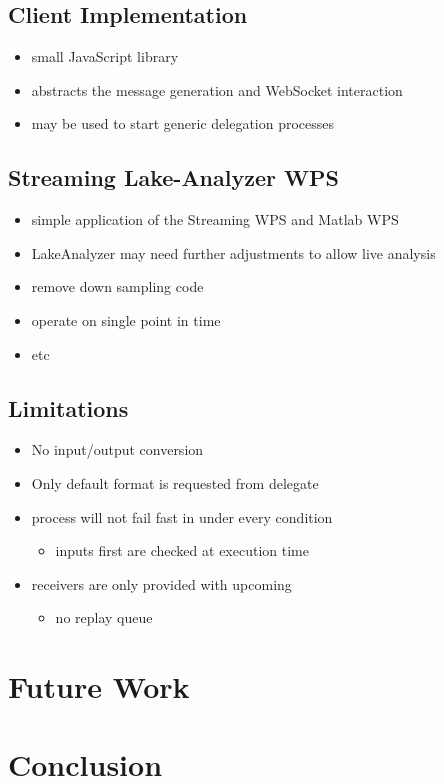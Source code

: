	\subsection{Client Implementation}
	\begin{itemize}
		\item small JavaScript library
		\item abstracts the message generation and WebSocket interaction
		\item may be used to start generic delegation processes
	\end{itemize}
	\subsection{Streaming Lake-Analyzer WPS}
	\begin{itemize}
		\item simple application of the Streaming WPS and Matlab WPS
		\item LakeAnalyzer may need further adjustments to allow live analysis
		\item remove down sampling code
		\item operate on single point in time
		\item etc
	\end{itemize}
	\subsection{Limitations}
	\begin{itemize}
		\item No input/output conversion
		\item Only default format is requested from delegate
		\item process will not fail fast in under every condition
		\begin{itemize}
			\item inputs first are checked at execution time
		\end{itemize}
		\item receivers are only provided with upcoming
		\begin{itemize}
			\item no replay queue
		\end{itemize}
	\end{itemize}
\section{Future Work}
\section{Conclusion}